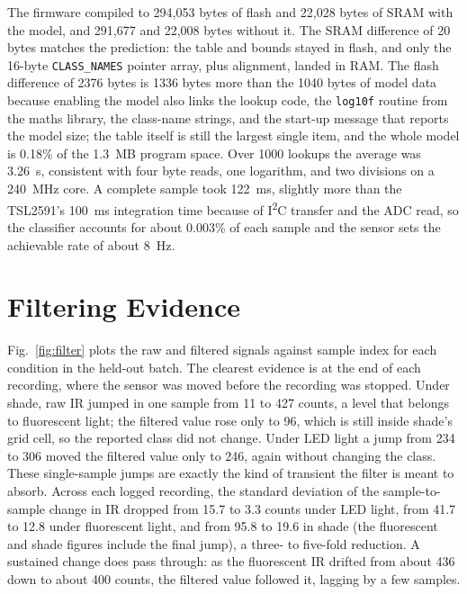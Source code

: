 \documentclass[10pt,a4paper,twocolumn]{article}
\begin{document}
The firmware compiled to 294{,}053 bytes of flash and 22{,}028 bytes of SRAM with the model, and 291{,}677 and 22{,}008 bytes without it. The SRAM difference of 20 bytes matches the prediction: the table and bounds stayed in flash, and only the 16-byte \texttt{CLASS\_NAMES} pointer array, plus alignment, landed in RAM. The flash difference of 2376 bytes is 1336 bytes more than the 1040 bytes of model data because enabling the model also links the lookup code, the \texttt{log10f} routine from the maths library, the class-name strings, and the start-up message that reports the model size; the table itself is still the largest single item, and the whole model is 0.18\% of the 1.3~MB program space. Over 1000 lookups the average was 3.26~\textmu s, consistent with four byte reads, one logarithm, and two divisions on a 240~MHz core. A complete sample took 122~ms, slightly more than the TSL2591's 100~ms integration time because of I\textsuperscript{2}C transfer and the ADC read, so the classifier accounts for about 0.003\% of each sample and the sensor sets the achievable rate of about 8~Hz.

\section{Filtering Evidence}
\label{sec:filter}

Fig.~\ref{fig:filter} plots the raw and filtered signals against sample index for each condition in the held-out batch. The clearest evidence is at the end of each recording, where the sensor was moved before the recording was stopped. Under shade, raw IR jumped in one sample from 11 to 427 counts, a level that belongs to fluorescent light; the filtered value rose only to 96, which is still inside shade's grid cell, so the reported class did not change. Under LED light a jump from 234 to 306 moved the filtered value only to 246, again without changing the class. These single-sample jumps are exactly the kind of transient the filter is meant to absorb. Across each logged recording, the standard deviation of the sample-to-sample change in IR dropped from 15.7 to 3.3 counts under LED light, from 41.7 to 12.8 under fluorescent light, and from 95.8 to 19.6 in shade (the fluorescent and shade figures include the final jump), a three- to five-fold reduction. A sustained change does pass through: as the fluorescent IR drifted from about 436 down to about 400 counts, the filtered value followed it, lagging by a few samples.
\end{document}
